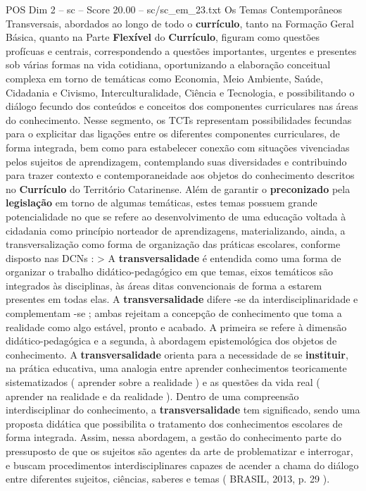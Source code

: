 \begin{textsample}{POS Dim 2 – sc – Score 20.00 – sc/sc\_em\_23.txt}
Os Temas Contemporâneos Transversais, abordados ao longo de todo o \textbf{currículo}, tanto na Formação Geral Básica, quanto na Parte \textbf{Flexível} do \textbf{Currículo}, figuram como questões profícuas e centrais, correspondendo a questões importantes, urgentes e presentes sob várias formas na vida cotidiana, oportunizando a elaboração conceitual complexa em torno de temáticas como Economia, Meio Ambiente, Saúde, Cidadania e Civismo, Interculturalidade, Ciência e Tecnologia, e possibilitando o diálogo fecundo dos conteúdos e conceitos dos componentes curriculares nas áreas do conhecimento.
Nesse segmento, os TCTs representam possibilidades fecundas para o explicitar das ligações entre os diferentes componentes curriculares, de forma integrada, bem como para estabelecer conexão com situações vivenciadas pelos sujeitos de aprendizagem, contemplando suas diversidades e contribuindo para trazer contexto e contemporaneidade aos objetos do conhecimento descritos no \textbf{Currículo} do Território Catarinense.
Além de garantir o \textbf{preconizado} pela \textbf{legislação} em torno de algumas temáticas, estes temas possuem grande potencialidade no que se refere ao desenvolvimento de uma educação voltada à cidadania como princípio norteador de aprendizagens, materializando, ainda, a transversalização como forma de organização das práticas escolares, conforme disposto nas DCNs : > A \textbf{transversalidade} é entendida como uma forma de organizar o trabalho didático-pedagógico em que temas, eixos temáticos são integrados às disciplinas, às áreas ditas convencionais de forma a estarem presentes em todas elas.
A \textbf{transversalidade} difere -se da interdisciplinaridade e complementam -se ; ambas rejeitam a concepção de conhecimento que toma a realidade como algo estável, pronto e acabado.
A primeira se refere à dimensão didático-pedagógica e a segunda, à abordagem epistemológica dos objetos de conhecimento.
A \textbf{transversalidade} orienta para a necessidade de se \textbf{instituir}, na prática educativa, uma analogia entre aprender conhecimentos teoricamente sistematizados ( aprender sobre a realidade ) e as questões da vida real ( aprender na realidade e da realidade ).
Dentro de uma compreensão interdisciplinar do conhecimento, a \textbf{transversalidade} tem significado, sendo uma proposta didática que possibilita o tratamento dos conhecimentos escolares de forma integrada.
Assim, nessa abordagem, a gestão do conhecimento parte do pressuposto de que os sujeitos são agentes da arte de problematizar e interrogar, e buscam procedimentos interdisciplinares capazes de acender a chama do diálogo entre diferentes sujeitos, ciências, saberes e temas ( BRASIL, 2013, p. 29 ).

\end{textsample}
